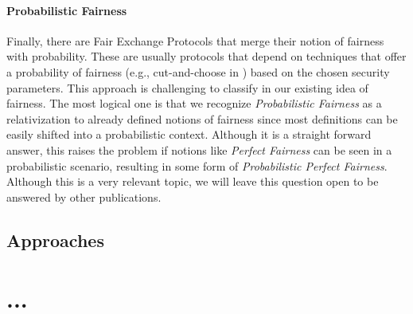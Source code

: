 \documentclass{cacthesis}
\begin{document}
        \subsubsection{Probabilistic Fairness}
        Finally, there are Fair Exchange Protocols that merge their notion of fairness with probability. These are usually protocols that depend on techniques that offer a probability of fairness (e.g., cut-and-choose in \cite{DELGADOSEGURA2020832}) based on the chosen security parameters. This approach is challenging to classify in our existing idea of fairness. The most logical one is that we recognize \textit{Probabilistic Fairness} as a relativization to already defined notions of fairness since most definitions can be easily shifted into a probabilistic context. Although it is a straight forward answer, this raises the problem if notions like \textit{Perfect Fairness} can be seen in a probabilistic scenario, resulting in some form of \textit{Probabilistic Perfect Fairness}. Although this is a very relevant topic, we will leave this question open to be answered by other publications.
        
        \section{Approaches} %
		
	\chapter{...}
	
	\newpage
    
    
	
	\appendix
\end{document}
